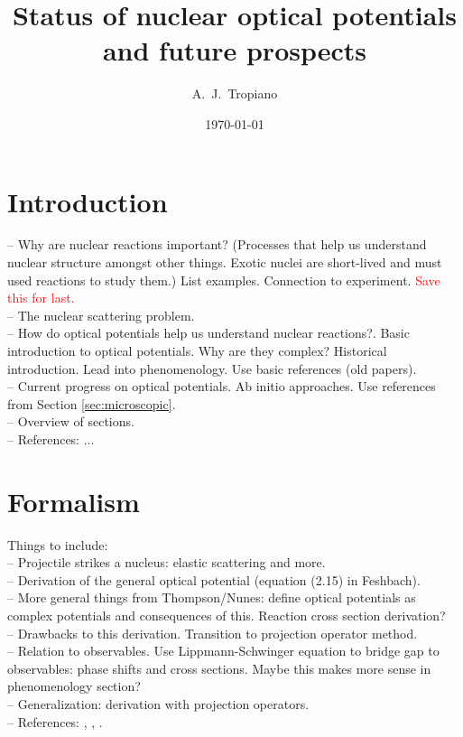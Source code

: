 \documentclass[preprintnumbers,floatfix,aps,prc,preprint,nofootinbib]{revtex4-1}
\begin{document}
\title{Status of nuclear optical potentials and future prospects}


\author{A.~J.~Tropiano}


\date{\today}

\maketitle

\newpage


\section{Introduction}
\label{sec:intro}


-- Why are nuclear reactions important? (Processes that help us understand nuclear structure amongst other things. Exotic nuclei are short-lived and must used reactions to study them.) List examples. Connection to experiment. \textcolor{red}{Save this for last.}
\\
-- The nuclear scattering problem.
\\
-- How do optical potentials help us understand nuclear reactions?. Basic introduction to optical potentials. Why are they complex? Historical introduction. Lead into phenomenology. Use basic references (old papers).
\\
-- Current progress on optical potentials. Ab initio approaches. Use references from Section \ref{sec:microscopic}.
\\
-- Overview of sections.
\\
-- References: ...


\section{Formalism}
\label{sec:formalism}


Things to include:
\\
-- Projectile strikes a nucleus: elastic scattering and more.
\\
-- Derivation of the general optical potential (equation (2.15) in Feshbach).
\\
-- More general things from Thompson/Nunes: define optical potentials as complex potentials and consequences of this. Reaction cross section derivation?
\\
-- Drawbacks to this derivation. Transition to projection operator method.
\\
-- Relation to observables. Use Lippmann-Schwinger equation to bridge gap to observables: phase shifts and cross sections. Maybe this makes more sense in phenomenology section?
\\
-- Generalization: derivation with projection operators.
\\
-- References: \cite{Feshbach:1958nx}, \cite{Feshbach:1962ut}, \cite{thompson_nunes_2009}.
\\
\end{document}
